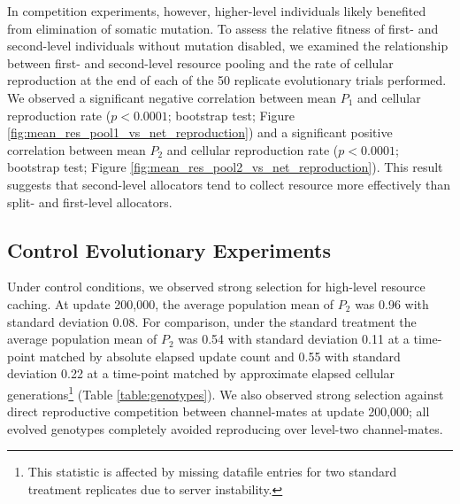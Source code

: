

In competition experiments, however, higher-level individuals likely benefited from elimination of somatic mutation.
To assess the relative fitness of first- and second-level individuals without mutation disabled, we examined the relationship between first- and second-level resource pooling and the rate of cellular reproduction at the end of each of the 50 replicate evolutionary trials performed.
We observed a significant negative correlation between mean $P_1$ and cellular reproduction rate ($p < 0.0001$; bootstrap test; Figure \ref{fig:mean_res_pool1_vs_net_reproduction}) and a significant positive correlation between mean $P_2$ and cellular reproduction rate ($p < 0.0001$; bootstrap test; Figure \ref{fig:mean_res_pool2_vs_net_reproduction}).
This result suggests that second-level allocators tend to collect resource more effectively than split- and first-level allocators.

\subsection{Control Evolutionary Experiments}



Under control conditions, we observed strong selection for high-level resource caching.
At update 200,000, the average population mean of $P_2$ was 0.96 with standard deviation 0.08.
For comparison, under the standard treatment the average population mean of $P_2$ was 0.54 with standard deviation 0.11 at a time-point matched by absolute elapsed update count and 0.55 with standard deviation 0.22 at a time-point matched by approximate elapsed cellular generations\footnote{This statistic is affected by missing datafile entries for two standard treatment replicates due to server instability.} (Table \ref{table:genotypes}).
We also observed strong selection against direct reproductive competition between channel-mates at update 200,000; all evolved genotypes completely avoided reproducing over level-two channel-mates.


